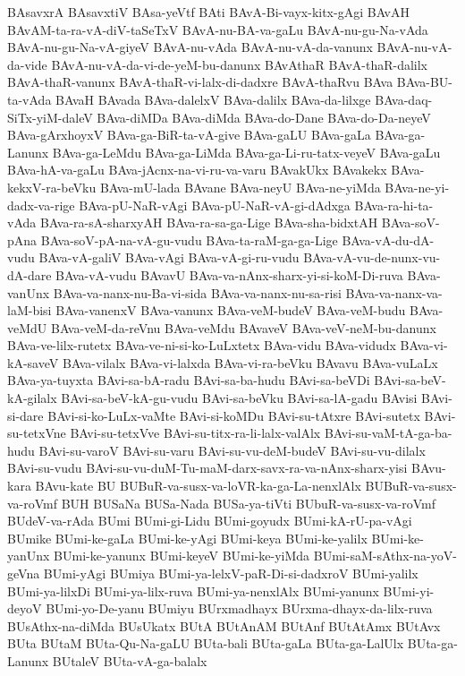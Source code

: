 {BAsavxrA
BAsavxtiV
BAsa-yeVtf
BAti
BAvA-Bi-vayx-kitx-gAgi
BAvAH
BAvAM-ta-ra-vA-diV-taSeTxV
BAvA-nu-BA-va-gaLu
BAvA-nu-gu-Na-vAda
BAvA-nu-gu-Na-vA-giyeV
BAvA-nu-vAda
BAvA-nu-vA-da-vanunx
BAvA-nu-vA-da-vide
BAvA-nu-vA-da-vi-de-yeM-bu-danunx
BAvAthaR
BAvA-thaR-dalilx
BAvA-thaR-vanunx
BAvA-thaR-vi-lalx-di-dadxre
BAvA-thaRvu
BAva
BAva-BU-ta-vAda
BAvaH
BAvada
BAva-dalelxV
BAva-dalilx
BAva-da-lilxge
BAva-daq-SiTx-yiM-daleV
BAva-diMDa
BAva-diMda
BAva-do-Dane
BAva-do-Da-neyeV
BAva-gArxhoyxV
BAva-ga-BiR-ta-vA-give
BAva-gaLU
BAva-gaLa
BAva-ga-Lanunx
BAva-ga-LeMdu
BAva-ga-LiMda
BAva-ga-Li-ru-tatx-veyeV
BAva-gaLu
BAva-hA-va-gaLu
BAva-jAcnx-na-vi-ru-va-varu
BAvakUkx
BAvakekx
BAva-kekxV-ra-beVku
BAva-mU-lada
BAvane
BAva-neyU
BAva-ne-yiMda
BAva-ne-yi-dadx-va-rige
BAva-pU-NaR-vAgi
BAva-pU-NaR-vA-gi-dAdxga
BAva-ra-hi-ta-vAda
BAva-ra-sA-sharxyAH
BAva-ra-sa-ga-Lige
BAva-sha-bidxtAH
BAva-soV-pAna
BAva-soV-pA-na-vA-gu-vudu
BAva-ta-raM-ga-ga-Lige
BAva-vA-du-dA-vudu
BAva-vA-galiV
BAva-vAgi
BAva-vA-gi-ru-vudu
BAva-vA-vu-de-nunx-vu-dA-dare
BAva-vA-vudu
BAvavU
BAva-va-nAnx-sharx-yi-si-koM-Di-ruva
BAva-vanUnx
BAva-va-nanx-nu-Ba-vi-sida
BAva-va-nanx-nu-sa-risi
BAva-va-nanx-va-laM-bisi
BAva-vanenxV
BAva-vanunx
BAva-veM-budeV
BAva-veM-budu
BAva-veMdU
BAva-veM-da-reVnu
BAva-veMdu
BAvaveV
BAva-veV-neM-bu-danunx
BAva-ve-lilx-rutetx
BAva-ve-ni-si-ko-LuLxtetx
BAva-vidu
BAva-vidudx
BAva-vi-kA-saveV
BAva-vilalx
BAva-vi-lalxda
BAva-vi-ra-beVku
BAvavu
BAva-vuLaLx
BAva-ya-tuyxta
BAvi-sa-bA-radu
BAvi-sa-ba-hudu
BAvi-sa-beVDi
BAvi-sa-beV-kA-gilalx
BAvi-sa-beV-kA-gu-vudu
BAvi-sa-beVku
BAvi-sa-lA-gadu
BAvisi
BAvi-si-dare
BAvi-si-ko-LuLx-vaMte
BAvi-si-koMDu
BAvi-su-tAtxre
BAvi-sutetx
BAvi-su-tetxVne
BAvi-su-tetxVve
BAvi-su-titx-ra-li-lalx-valAlx
BAvi-su-vaM-tA-ga-ba-hudu
BAvi-su-varoV
BAvi-su-varu
BAvi-su-vu-deM-budeV
BAvi-su-vu-dilalx
BAvi-su-vudu
BAvi-su-vu-duM-Tu-maM-darx-savx-ra-va-nAnx-sharx-yisi
BAvu-kara
BAvu-kate
BU
BUBuR-va-susx-va-loVR-ka-ga-La-nenxlAlx
BUBuR-va-susx-va-roVmf
BUH
BUSaNa
BUSa-Nada
BUSa-ya-tiVti
BUbuR-va-susx-va-roVmf
BUdeV-va-rAda
BUmi
BUmi-gi-Lidu
BUmi-goyudx
BUmi-kA-rU-pa-vAgi
BUmike
BUmi-ke-gaLa
BUmi-ke-yAgi
BUmi-keya
BUmi-ke-yalilx
BUmi-ke-yanUnx
BUmi-ke-yanunx
BUmi-keyeV
BUmi-ke-yiMda
BUmi-saM-sAthx-na-yoV-geVna
BUmi-yAgi
BUmiya
BUmi-ya-lelxV-paR-Di-si-dadxroV
BUmi-yalilx
BUmi-ya-lilxDi
BUmi-ya-lilx-ruva
BUmi-ya-nenxlAlx
BUmi-yanunx
BUmi-yi-deyoV
BUmi-yo-De-yanu
BUmiyu
BUrxmadhayx
BUrxma-dhayx-da-lilx-ruva
BUsAthx-na-diMda
BUsUkatx
BUtA
BUtAnAM
BUtAnf
BUtAtAmx
BUtAvx
BUta
BUtaM
BUta-Qu-Na-gaLU
BUta-bali
BUta-gaLa
BUta-ga-LalUlx
BUta-ga-Lanunx
BUtaleV
BUta-vA-ga-balalx
}
